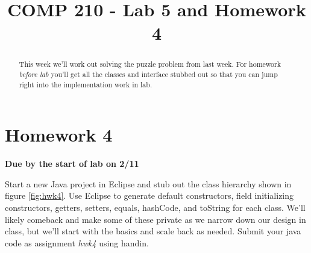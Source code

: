 \documentclass[]{tufte-handout}
\title{COMP 210 - Lab 5 and Homework 4}
\begin{document}
\maketitle

\begin{abstract}
This week we'll work out solving the puzzle problem from last week. For homework \textit{before lab} you'll get all the classes and interface stubbed out so that you can jump right into the implementation work in lab. 
\end{abstract}

\section{Homework 4}

\begin{center}
\textbf{Due by the start of lab on 2/11}
\end{center}

Start a new Java project in Eclipse and stub out the class hierarchy shown in figure \ref{fig:hwk4}. Use Eclipse to generate default constructors, field initializing constructors, getters, setters, equals, hashCode, and toString for each class.  We'll likely comeback and make some of these private as we narrow down our design in class, but we'll start with the basics and scale back as needed. Submit your java code as assignment \textit{hwk4} using handin.
\end{document}
